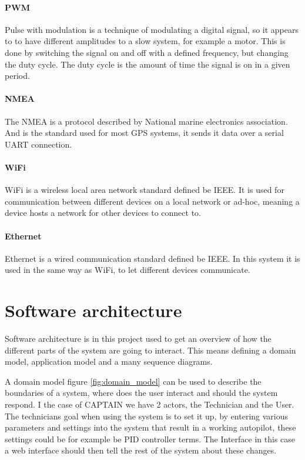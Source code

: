 \paragraph{PWM}
Pulse with modulation is a technique of modulating a digital signal, so it appears to to have different amplitudes to a slow system, for example a motor. This is done by switching the signal on and off with a defined frequency, but changing the duty cycle. The duty cycle is the amount of time the signal is on in a given period.\cite{PWM}

\paragraph{NMEA}
The NMEA is a protocol described by National marine electronics association. And is the standard used for most GPS systems, it sends it data over a serial UART connection. \cite{NMEA}

\paragraph{WiFi}
WiFi is a wireless local area network standard defined be IEEE\cite{WIFI}. It is used for communication between different devices on a local network or ad-hoc, meaning a device hosts a network for other devices to connect to. 

\paragraph{Ethernet}
Ethernet is a wired communication standard defined be IEEE\cite{ethernet}. In this system it is used in the same way as WiFi, to let different devices communicate.

\section{Software architecture}
Software architecture is in this project used to get an overview of how the different parts of the system are going to interact.
This means defining a domain model, application model and a many sequence diagrams. 

A domain model figure \ref{fig:domain_model} can be used to describe the boundaries of a system, where does the user interact and should the system respond. I the case of CAPTAIN we have 2 actors, the Technician and the User. The technicians goal when using the system is to set it up, by entering various parameters and settings into the system that result in a working autopilot, these settings could be for example be PID controller terms. The Interface in this case a web interface should then tell the rest of the system about these changes.

